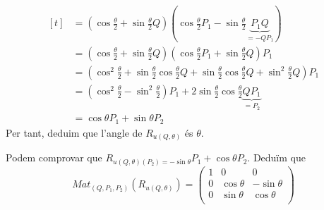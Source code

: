\documentclass[a4paper,12pt]{article}
\begin{document}
\begin{demostracio}
\begin{displaymath}
\begin{aligned}[t]
									&= (\cos{\frac{\theta}{2}} + \sin{\frac{\theta}{2}}Q)(\cos{\frac{\theta}{2}}P_1 - \sin{\frac{\theta}{2}}\underbrace{P_1Q}_{=-QP_1})\\
									&= (\cos{\frac{\theta}{2}} + \sin{\frac{\theta}{2}}Q)(\cos{\frac{\theta}{2}}P_1 + \sin{\frac{\theta}{2}}Q)P_1\\
									&= (\cos^2{\frac{\theta}{2}} + \sin{\frac{\theta}{2}}\cos{\frac{\theta}{2}}Q + \sin{\frac{\theta}{2}}\cos{\frac{\theta}{2}}Q + \sin^2{\frac{\theta}{2}}Q)P_1\\
									&= (\cos^2{\frac{\theta}{2}} - \sin^2{\frac{\theta}{2}})P_1 + 2\sin{\frac{\theta}{2}}\cos{\frac{\theta}{2}}\underbrace{QP_1}_{=P_2}\\
									&= \cos{\theta}P_1 + \sin{\theta}P_2
			\end{aligned}
		\end{displaymath}
		Per tant, deduim que l'angle de $R_{u(Q, \theta)}$ és $\theta$.
	\end{demostracio}
	\begin{obs}
		Podem comprovar que $R_{u(Q, \theta)(P_2) = -\sin{\theta}}P_1 + \cos{\theta}P_2$.
		Deduïm que
		\begin{displaymath}
			Mat_(Q, P_1, P_2)(R_{u(Q, \theta)}) = \begin{pmatrix}
				1 & 0 & 0\\
				0 & \cos{\theta} & -\sin{\theta}\\
				0 &\sin{\theta} & \cos{\theta}\\
			\end{pmatrix}
		\end{displaymath}
	\end{obs}
\end{document}
